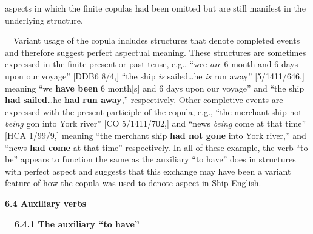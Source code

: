 \begin{styleStandard}
aspects in which the finite copulas had been omitted but are still manifest in the underlying structure. 
\end{styleStandard}


\begin{styleStandard}
\ \ Variant usage of the copula includes structures that denote completed events and therefore suggest perfect aspectual meaning. These structures are sometimes expressed in the finite present or past tense, e.g., “wee\textit{ are} 6 month and 6 days upon our voyage” [DDB6 8/4,] “the ship \textit{is }sailed…he \textit{is} run away” [5/1411/646,] meaning “we \textbf{have been} 6 month[s] and 6 days upon our voyage” and “the ship \textbf{had}\textbf{\textit{ }}\textbf{sailed}…he \textbf{had} \textbf{run away},” respectively. Other completive events are expressed with the present participle of the copula, e.g., “the merchant ship not \textit{being} gon into York river” [CO 5/1411/702,] and “news \textit{being} come at that time” [HCA 1/99/9,] meaning “the merchant ship \textbf{had not gone} into York river,” and “news \textbf{had come} at that time” respectively. In all of these example, the verb “to be” appears to function the same as the auxiliary “to have” does in structures with perfect aspect and suggests that this exchange may have been a variant feature of how the copula was used to denote aspect in Ship English. 
\end{styleStandard}


\begin{styleStandard}
\textbf{6.4 Auxiliary verbs}
\end{styleStandard}


\begin{styleStandard}
\textbf{\ \ 6.4.1 The auxiliary “to have”}
\end{styleStandard}


